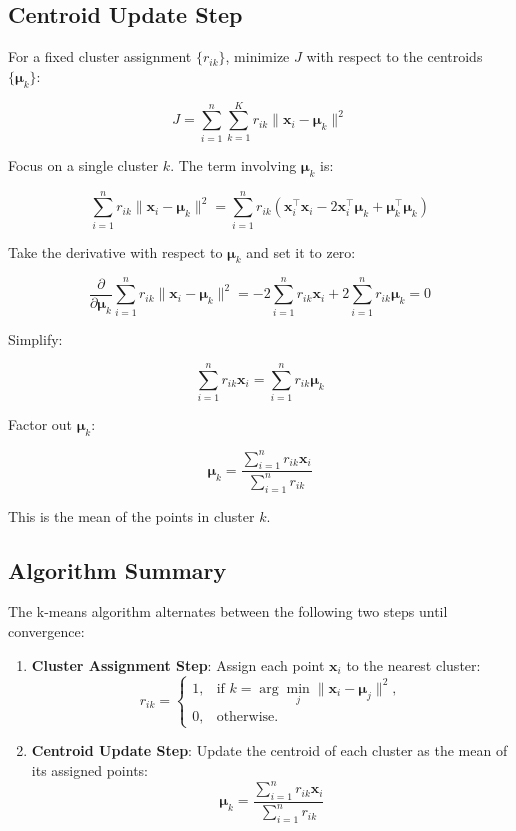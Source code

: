 \subsection*{Centroid Update Step}
For a fixed cluster assignment \( \{ r_{ik} \} \), minimize \( J \) with respect to the centroids \( \{ \boldsymbol{\mu}_k \} \):

\[
J = \sum_{i=1}^{n} \sum_{k=1}^{K} r_{ik} \| \mathbf{x}_i - \boldsymbol{\mu}_k \|^2
\]

Focus on a single cluster \( k \). The term involving \( \boldsymbol{\mu}_k \) is:

\[
\sum_{i=1}^{n} r_{ik} \| \mathbf{x}_i - \boldsymbol{\mu}_k \|^2
= \sum_{i=1}^{n} r_{ik} \left( \mathbf{x}_i^\top \mathbf{x}_i - 2 \mathbf{x}_i^\top \boldsymbol{\mu}_k + \boldsymbol{\mu}_k^\top \boldsymbol{\mu}_k \right)
\]

Take the derivative with respect to \( \boldsymbol{\mu}_k \) and set it to zero:

\[
\frac{\partial}{\partial \boldsymbol{\mu}_k} \sum_{i=1}^{n} r_{ik} \| \mathbf{x}_i - \boldsymbol{\mu}_k \|^2 =
-2 \sum_{i=1}^{n} r_{ik} \mathbf{x}_i + 2 \sum_{i=1}^{n} r_{ik} \boldsymbol{\mu}_k = 0
\]

Simplify:

\[
\sum_{i=1}^{n} r_{ik} \mathbf{x}_i = \sum_{i=1}^{n} r_{ik} \boldsymbol{\mu}_k
\]

Factor out \( \boldsymbol{\mu}_k \):

\[
\boldsymbol{\mu}_k = \frac{\sum_{i=1}^{n} r_{ik} \mathbf{x}_i}{\sum_{i=1}^{n} r_{ik}}
\]

This is the mean of the points in cluster \( k \).

\subsection*{Algorithm Summary}
The k-means algorithm alternates between the following two steps until convergence:

\begin{enumerate}
    \item \textbf{Cluster Assignment Step}: Assign each point \( \mathbf{x}_i \) to the nearest cluster:
    \[
    r_{ik} =
    \begin{cases} 
    1, & \text{if } k = \arg\min_{j} \| \mathbf{x}_i - \boldsymbol{\mu}_j \|^2, \\
    0, & \text{otherwise.}
    \end{cases}
    \]
    \item \textbf{Centroid Update Step}: Update the centroid of each cluster as the mean of its assigned points:
    \[
    \boldsymbol{\mu}_k = \frac{\sum_{i=1}^{n} r_{ik} \mathbf{x}_i}{\sum_{i=1}^{n} r_{ik}}
    \]
\end{enumerate}

